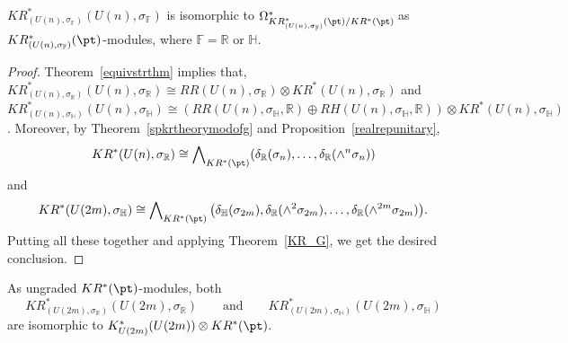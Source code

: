 \begin{Lemma}
$KR^*_{(U(n),
\sigma_\mathbb{\mathbb{F}})}\!(U(n){,}
\sigma_\mathbb{F})$ is isomorphic to $\Omega^*_{KR^*_{(U(n),
\sigma_\mathbb{F})}(\pt)/ KR^*(\pt)}\!$ as $KR^*_{(U(n),
\sigma_\mathbb{F})}(\pt)$-modules,
where $\mathbb{F}=\mathbb{R}$ or $\mathbb{H}$.
\end{Lemma}
\begin{proof}
Theorem~\ref{equivstrthm} implies that, $KR^*_{(U(n),
\sigma_\mathbb{R})}(U(n),
\sigma_\mathbb{R})\cong RR(U(n),
\sigma_\mathbb{R})\otimes KR^*(U(n),
\sigma_\mathbb{R})$ and $KR^*_{(U(n),
\sigma_\mathbb{H})}(U(n),
\sigma_\mathbb{H})\cong (RR(U(n),
\sigma_\mathbb{H}, \mathbb{R})\oplus RH(U(n),
\sigma_\mathbb{H}, \mathbb{R}))\otimes KR^*(U(n),
\sigma_\mathbb{H})$.
Moreover, by Theorem~\ref{spkrtheorymodofg} and Proposition~\ref{realrepunitary},
\begin{gather*}
KR^*(U(n),
\sigma_\mathbb{R})\cong \bigwedge\nolimits_{KR^*(\pt)}(\delta_\mathbb{R}(\sigma_n), \dots, \delta_\mathbb{R}
(\wedge^n
\sigma_n))
\end{gather*}
and
\begin{gather*}
KR^*(U(2m),
\sigma_\mathbb{H})\cong\bigwedge\nolimits_{KR^*(\pt)}\big(\delta_\mathbb{H}(\sigma_{2m}), \delta_\mathbb{R}(\wedge^2
\sigma_{2m}), \dots, \delta_\mathbb{R}(\wedge^{2m}\sigma_{2m})\big).
\end{gather*}
Putting all these together and applying Theorem~\ref{KR_G}, we get the desired conclusion.
\end{proof}
\begin{Remark}
\label{ungradediso}
As ungraded $KR^*(\pt)$-modules, both
\[
KR_{(U(2m),
\sigma_\mathbb{R})}^*(U(2m),
\sigma_\mathbb{R}) \qquad \text{and}\qquad KR^*_{(U(2m),
\sigma_\mathbb{H})}(U(2m),
\sigma_\mathbb{H})
\]
 are isomorphic to $K^*_{U(2m)}(U(2m))\otimes KR^*(\pt)$.
\end{Remark}

